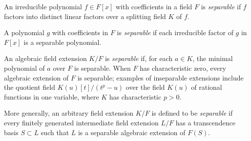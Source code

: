 \documentclass[12pt]{article}
\begin{document}
An irreducible polynomial $f \in F[x]$ with coefficients in a field $F$ is {\em separable} if $f$ factors into distinct linear factors over a splitting field $K$ of $f$.

A polynomial $g$ with coefficients in $F$ is {\em separable} if each irreducible factor of $g$ in $F[x]$ is a separable polynomial.

An algebraic field extension $K/F$ is {\em separable} if, for each $a \in K$, the minimal polynomial of $a$ over $F$ is separable. When $F$ has characteristic zero, every algebraic extension of $F$ is separable; examples of inseparable extensions include the quotient field $K(u)[t]/(t^p-u)$ over the field $K(u)$ of rational functions in one variable, where $K$ has characteristic $p > 0$.

More generally, an arbitrary field extension $K/F$ is defined to be {\em separable} if every finitely generated intermediate field extension $L/F$ has a transcendence basis $S \subset L$ such that $L$ is a separable algebraic extension of $F(S)$.
\end{document}
